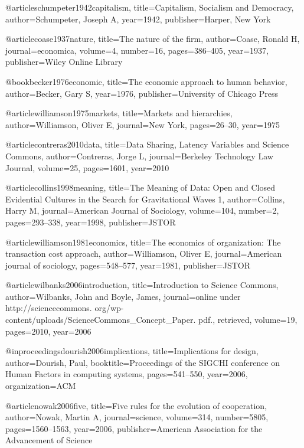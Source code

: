 @article{schumpeter1942capitalism,
  title={Capitalism, Socialism and Democracy},
  author={Schumpeter, Joseph A},
  year={1942},
  publisher={Harper, New York}
}

@article{coase1937nature,
  title={The nature of the firm},
  author={Coase, Ronald H},
  journal={economica},
  volume={4},
  number={16},
  pages={386--405},
  year={1937},
  publisher={Wiley Online Library}
}

@book{becker1976economic,
  title={The economic approach to human behavior},
  author={Becker, Gary S},
  year={1976},
  publisher={University of Chicago Press}
}

@article{williamson1975markets,
  title={Markets and hierarchies},
  author={Williamson, Oliver E},
  journal={New York},
  pages={26--30},
  year={1975}
}

@article{contreras2010data,
  title={Data Sharing, Latency Variables and Science Commons},
  author={Contreras, Jorge L},
  journal={Berkeley Technology Law Journal},
  volume={25},
  pages={1601},
  year={2010}
}

@article{collins1998meaning,
  title={The Meaning of Data: Open and Closed Evidential Cultures in the Search for Gravitational Waves 1},
  author={Collins, Harry M},
  journal={American Journal of Sociology},
  volume={104},
  number={2},
  pages={293--338},
  year={1998},
  publisher={JSTOR}
}


@article{williamson1981economics,
  title={The economics of organization: The transaction cost approach},
  author={Williamson, Oliver E},
  journal={American journal of sociology},
  pages={548--577},
  year={1981},
  publisher={JSTOR}
}

@article{wilbanks2006introduction,
  title={Introduction to Science Commons},
  author={Wilbanks, John and Boyle, James},
  journal={online under http://sciencecommons. org/wp-content/uploads/ScienceCommons\_Concept\_Paper. pdf., retrieved},
  volume={19},
  pages={2010},
  year={2006}
}

@inproceedings{dourish2006implications,
  title={Implications for design},
  author={Dourish, Paul},
  booktitle={Proceedings of the SIGCHI conference on Human Factors in computing systems},
  pages={541--550},
  year={2006},
  organization={ACM}
}


@article{nowak2006five,
  title={Five rules for the evolution of cooperation},
  author={Nowak, Martin A},
  journal={science},
  volume={314},
  number={5805},
  pages={1560--1563},
  year={2006},
  publisher={American Association for the Advancement of Science}
}

